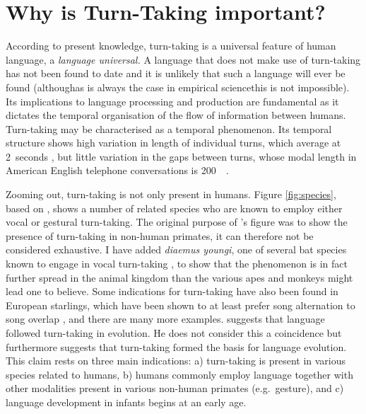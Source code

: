 \section{Why is Turn-Taking important?}
\label{sec:introductionttimportant}
According to present knowledge, turn-taking is a universal feature of human language, a \emph{language universal.}
A language that does not make use of turn-taking has not been found to date and it is unlikely that such a language will ever be found (although\dash as is always the case in empirical science\dash this is not impossible).
Its implications to language processing and production are fundamental as it dictates the temporal organisation of the flow of information between humans.
Turn-taking may be characterised as a temporal phenomenon.
Its temporal structure shows high variation in length of individual turns, which average at 2~seconds \citep[]{levinson_turn-taking_2016}, but little variation in the gaps between turns, whose modal length in American English telephone conversations is 200~\ms\ \citep[]{levinson_timing_2015}.

Zooming out, turn-taking is not only present in humans.
Figure \ref{fig:species}, based on \citet[]{levinson_turn-taking_2016}, shows a number of related species who are known to employ either vocal or gestural turn-taking.
The original purpose of \citeauthor{levinson_turn-taking_2016}'s figure was to show the presence of turn-taking in non-human primates, it can therefore not be considered exhaustive.
I have added \emph{diaemus youngi}, one of several bat species known to engage in vocal turn-taking \citep[]{vernes_what_2017}, to show that the phenomenon is in fact further spread in the animal kingdom than the various apes and monkeys might lead one to believe.
Some indications for turn-taking have also been found in European starlings, which have been shown to at least prefer song alternation to song overlap \citep{henry_social_2015}, and there are many more examples.
\citet[]{levinson_turn-taking_2016} suggests that language followed turn-taking in evolution. He does not consider this a coincidence but furthermore suggests that turn-taking formed the basis for language evolution.
This claim rests on three main indications: a) turn-taking is present in various species related to humans, b) humans commonly employ language together with other modalities present in various non-human primates (e.g.~gesture), and c) language development in infants begins at an early age.

